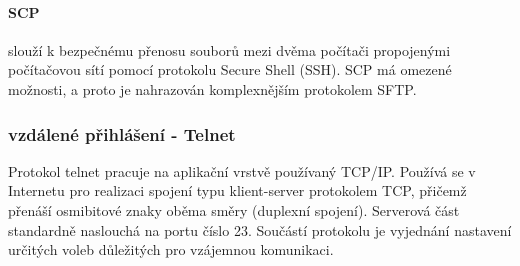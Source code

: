 \documentclass[10pt,a4paper]{article}
\begin{document}
 \paragraph{SCP} slouží k bezpečnému přenosu souborů mezi dvěma počítači propojenými počítačovou sítí pomocí protokolu Secure Shell (SSH). SCP má omezené možnosti, a proto je nahrazován komplexnějším protokolem SFTP.

\subsubsection{vzdálené přihlášení - Telnet}
Protokol telnet pracuje na aplikační vrstvě používaný TCP/IP. Používá se v Internetu pro realizaci spojení typu klient-server protokolem TCP, přičemž přenáší osmibitové znaky oběma směry (duplexní spojení). Serverová část standardně naslouchá na portu číslo 23. Součástí protokolu je vyjednání nastavení určitých voleb důležitých pro vzájemnou komunikaci. \\
\end{document}
